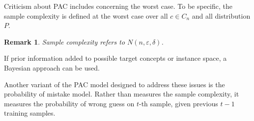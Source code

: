 \documentclass[12pt, a4paper, oneside]{article}
\newtheorem{remark}[theorem]{Remark}
\begin{document}
Criticism about PAC includes concerning the worst case. To be specific, the sample complexity is defined at the worst case over all $c\in C_n$ and all distribution $P$.
\begin{remark}
    Sample complexity refers to $N(n,\varepsilon,\delta)$.
\end{remark}


If prior information added to possible target concepts or instance space, a Bayesian approach can be used. 


Another variant of the PAC model designed to address these issues is the probability of mistake model. Rather than measures the sample complexity, it measures the probability of wrong guess on $t$-th sample, given previous $t-1$ training samples.
\newpage


\end{document}
